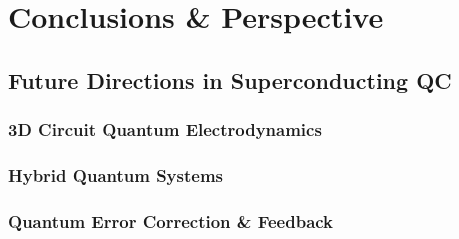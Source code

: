 \chapter{Conclusions \& Perspective}


\section{Future Directions in Superconducting QC}


\subsection{3D Circuit Quantum Electrodynamics}


\subsection{Hybrid Quantum Systems}


\subsection{Quantum Error Correction \& Feedback}

